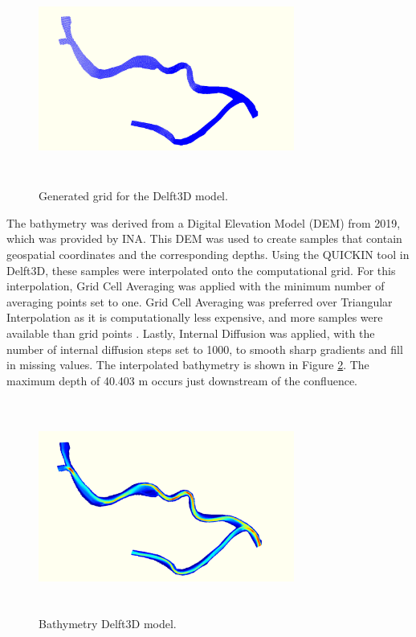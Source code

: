\begin{figure}[h]
    \centering
    \includegraphics[width=0.75\textwidth, height=7cm]{figures/ch7/Grid_Guazu.png}
    \caption{Generated grid for the Delft3D model.}
    \label{fig:Grid_Guazu_Delft3D}
\end{figure}


The bathymetry was derived from a Digital Elevation Model (DEM) from 2019, which was provided by INA. This DEM was used to create samples that contain geospatial coordinates and the corresponding depths. Using the QUICKIN tool in Delft3D, these samples were interpolated onto the computational grid. For this interpolation, Grid Cell Averaging was applied with the minimum number of averaging points set to one. Grid Cell Averaging was preferred over Triangular Interpolation as it is computationally less expensive, and more samples were available than grid points \autocite{deltaresQUICKINUserManual2025}. Lastly, Internal Diffusion was applied, with the number of internal diffusion steps set to 1000, to smooth sharp gradients and fill in missing values. The interpolated bathymetry is shown in Figure \ref{fig:Bathymetry_Delft3D}. The maximum depth of 40.403 m occurs just downstream of the confluence. 

\begin{figure}[H]
    \centering
    \includegraphics[width=0.75\textwidth, height=7cm]{figures/ch7/Bathymetry_Gueazu_Delft3D.png}
    \caption{Bathymetry Delft3D model.}
    \label{fig:Bathymetry_Delft3D}
\end{figure}


